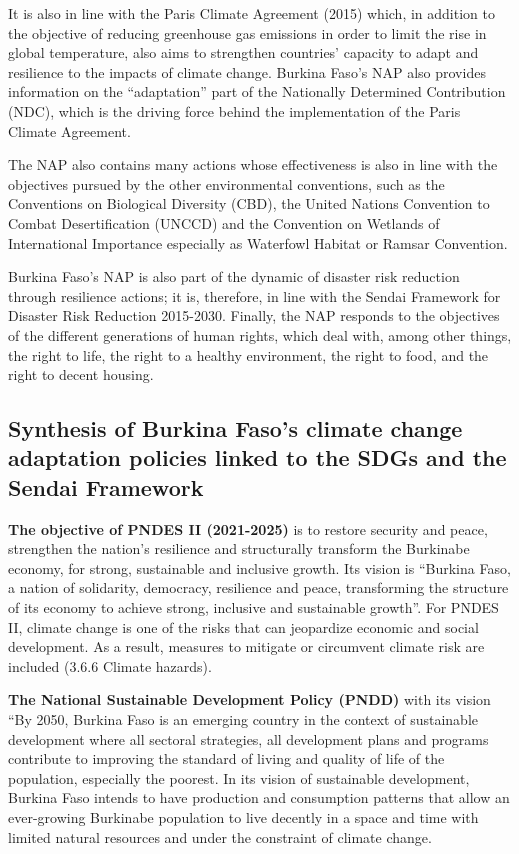 \documentclass[
]{book}
\begin{document}
It is also in line with the Paris Climate Agreement (2015) which, in addition to the objective of reducing greenhouse gas emissions in order to limit the rise in global temperature, also aims to strengthen countries' capacity to adapt and resilience to the impacts of climate change. Burkina Faso's NAP also provides information on the ``adaptation'' part of the Nationally Determined Contribution (NDC), which is the driving force behind the implementation of the Paris Climate Agreement.

The NAP also contains many actions whose effectiveness is also in line with the objectives pursued by the other environmental conventions, such as the Conventions on Biological Diversity (CBD), the United Nations Convention to Combat Desertification (UNCCD) and the Convention on Wetlands of International Importance especially as Waterfowl Habitat or Ramsar Convention.

Burkina Faso's NAP is also part of the dynamic of disaster risk reduction through resilience actions; it is, therefore, in line with the Sendai Framework for Disaster Risk Reduction 2015-2030. Finally, the NAP responds to the objectives of the different generations of human rights, which deal with, among other things, the right to life, the right to a healthy environment, the right to food, and the right to decent housing.

\subsection{Synthesis of Burkina Faso's climate change adaptation policies linked to the SDGs and the Sendai Framework}\label{synthesis-of-burkina-fasos-climate-change-adaptation-policies-linked-to-the-sdgs-and-the-sendai-framework}

\textbf{The objective of PNDES II (2021-2025)} is to restore security and peace, strengthen the nation's resilience and structurally transform the Burkinabe economy, for strong, sustainable and inclusive growth. Its vision is ``Burkina Faso, a nation of solidarity, democracy, resilience and peace, transforming the structure of its economy to achieve strong, inclusive and sustainable growth''. For PNDES II, climate change is one of the risks that can jeopardize economic and social development. As a result, measures to mitigate or circumvent climate risk are included (3.6.6 Climate hazards).

\textbf{The National Sustainable Development Policy (PNDD)} with its vision ``By 2050, Burkina Faso is an emerging country in the context of sustainable development where all sectoral strategies, all development plans and programs contribute to improving the standard of living and quality of life of the population, especially the poorest. In its vision of sustainable development, Burkina Faso intends to have production and consumption patterns that allow an ever-growing Burkinabe population to live decently in a space and time with limited natural resources and under the constraint of climate change.
\end{document}
